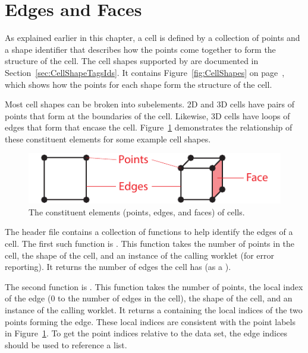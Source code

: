 

\section{Edges and Faces}

As explained earlier in this chapter, a cell is defined by a collection of    points and a   shape identifier that describes how the points come together to form the structure of the cell.
The cell shapes supported by \VTKm are documented in Section~\ref{sec:CellShapeTagsIds}.
It contains Figure~\ref{fig:CellShapes} on page~\pageref{fig:CellShapes}, which shows how the points for each shape form the structure of the cell.

Most cell shapes can be broken into subelements. 2D and 3D cells have pairs of points that form  at the boundaries of the cell.
Likewise, 3D cells have loops of edges that form  that encase the cell.
Figure~\ref{fig:CellConstituents} demonstrates the relationship of these constituent elements for some example cell shapes.

\begin{figure}[htb]
  \centering
  \includegraphics{images/CellConstituents}
  \caption{The constituent elements (points, edges, and faces) of cells.}
  \label{fig:CellConstituents}
\end{figure}


The header file  contains a collection of functions to help identify the edges of a cell.
The first such function is .
This function takes the number of points in the cell, the shape of the cell, and an instance of the calling worklet (for error reporting).
It returns the number of edges the cell has (as a ).

The second function is .
This function takes the number of points, the local index of the edge (0 to the number of edges in the cell), the shape of the cell, and an instance of the calling worklet.
It returns a  containing the local indices of the two points forming the edge.
These local indices are consistent with the point labels in Figure~\ref{fig:CellConstituents}.
To get the point indices relative to the data set, the edge indices should be used to reference a  list.

